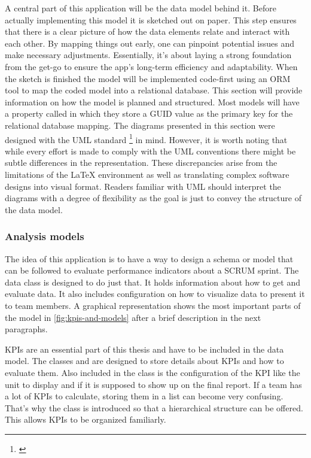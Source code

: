 A central part of this application will be the data model behind it. Before actually implementing this model it is sketched out on paper. This step ensures that there is a clear picture of how the data elements relate and interact with each other. By mapping things out early, one can pinpoint potential issues and make necessary adjustments. Essentially, it's about laying a strong foundation from the get-go to ensure the app's long-term efficiency and adaptability. When the sketch is finished the model will be implemented code-first using an ORM tool to map the coded model into a relational database. This section will provide information on how the model is planned and structured. Most models will have a property called  in which they store a GUID value as the primary key for the relational database mapping. The diagrams presented in this section were designed with the UML standard \footnote{\cite{uml_standard}} in mind. However, it is worth noting that while every effort is made to comply with the UML conventions there might be subtle differences in the representation. These discrepancies arise from the limitations of the LaTeX environment as well as translating complex software designs into visual format. Readers familiar with UML should interpret the diagrams with a degree of flexibility as the goal is just to convey the structure of the data model.
 
\subsubsection{Analysis models}

The idea of this application is to have a way to design a schema or model that can be followed to evaluate performance indicators about a SCRUM sprint. The  data class is designed to do just that. It holds information about how to get and evaluate data. It also includes configuration on how to visualize data to present it to team members. A graphical representation shows the most important parts of the model in \ref{fig:kpis-and-models} after a brief description in the next paragraphs.

KPIs are an essential part of this thesis and have to be included in the data model. The classes  and  are designed to store details about KPIs and how to evaluate them. Also included in the  class is the configuration of the KPI like the unit to display and if it is supposed to show up on the final report. 
If a team has a lot of KPIs to calculate, storing them in a list can become very confusing. That's why the class  is introduced so that a hierarchical structure can be offered. This allows KPIs to be organized familiarly.

